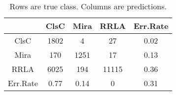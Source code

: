 \begin{table}[h]
\begin{center}
\begin{tabular}{cccc|c}
  & ClsC & Mira & RRLA & Err.Rate \\ 
  \hline
ClsC & 1802 & 4 & 27 & 0.02 \\ 
  Mira & 170 & 1251 & 17 & 0.13 \\ 
  RRLA & 6025 & 194 & 11115 & 0.36 \\ 
   \hline
Err.Rate & 0.77 & 0.14 & 0 & 0.31 \\ 
  \end{tabular}
\caption{Rows are true class. Columns are predictions.}
\end{center}
\end{table}
